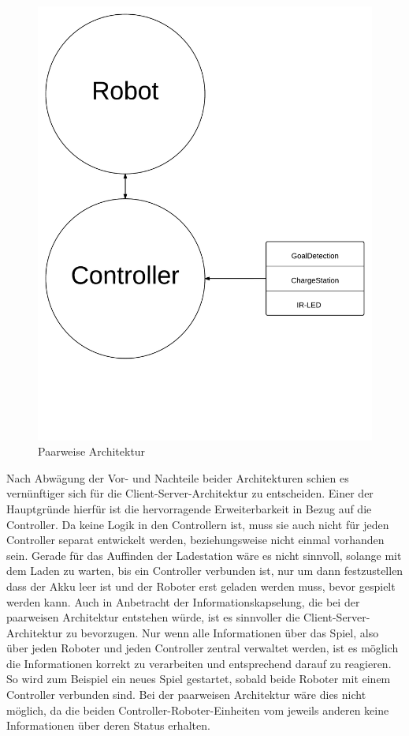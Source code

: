 \begin{figure}
	\includegraphics[height=0.5\textheight]{images/paarweise_architektur.pdf}
	\caption{Paarweise Architektur}
	\label{fig:paarweise_architektur}
\end{figure}


Nach Abwägung der Vor- und Nachteile beider Architekturen schien es vernünftiger sich für die Client-Server-Architektur zu entscheiden. Einer der Hauptgründe hierfür ist die hervorragende Erweiterbarkeit in Bezug auf die Controller. Da keine Logik in den Controllern ist, muss sie auch nicht für jeden Controller separat entwickelt werden, beziehungsweise nicht einmal vorhanden sein. Gerade für das Auffinden der Ladestation wäre es nicht sinnvoll, solange mit dem Laden zu warten, bis ein Controller verbunden ist, nur um dann festzustellen dass der Akku leer ist und der Roboter erst geladen werden muss, bevor gespielt werden kann. Auch in Anbetracht der Informationskapselung, die bei der paarweisen Architektur entstehen würde, ist es sinnvoller die Client-Server-Architektur zu bevorzugen. Nur wenn alle Informationen über das Spiel, also über jeden Roboter und jeden Controller zentral verwaltet werden, ist es möglich die Informationen korrekt zu verarbeiten und entsprechend darauf zu reagieren. So wird zum Beispiel ein neues Spiel gestartet, sobald beide Roboter mit einem Controller verbunden sind. Bei der paarweisen Architektur wäre dies nicht möglich, da die beiden Controller-Roboter-Einheiten vom jeweils anderen keine Informationen über deren Status erhalten.